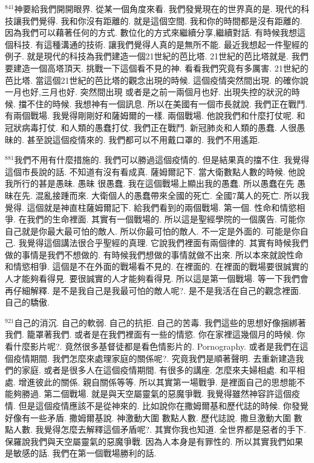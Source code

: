 \documentclass{book}
\begin{document}
$^{841}$神要給我們開開眼界.
從某一個角度來看.
我們發覺現在的世界真的是.
現代的科技讓我們覺得.
我和你沒有距離的.
就是這個空間.
我和你的時間都是沒有距離的.
因為我們可以藉著任何的方式.
數位化的方式來繼續分享,繼續對話.
有時候我想這個科技.
有這種溝通的技術.
讓我們覺得人真的是無所不能.
最近我想起一件聖經的例子.
就是現代的科技為我們建造一個21世紀的芭比塔.
21世紀的芭比塔就是.
我們要建造一個高塔頂天.
挑戰一下這個看不見的神.
看看我們究竟有多厲害.
21世紀的芭比塔.
當這個21世紀的芭比塔的觀念出現的時候.
這個疫情突然間出現.
的確你說一月也好,三月也好.
突然間出現 或者是之前一兩個月也好.
出現失控的狀況的時候.
擋不住的時候.
我想神有一個訊息.
所以在美國有一個市長就說.
我們正在戰鬥.
有兩個戰場.
我覺得剛剛好和薩姆爾的一樣.
兩個戰場.
他說我們和什麼打仗呢.
和冠狀病毒打仗.
和人類的愚蠢打仗.
我們正在戰鬥.
新冠肺炎和人類的愚蠢.
人很愚昧的.
甚至說這個疫情來的.
我們都可以不用戴口罩的.
我們不用遙距.

$^{881}$我們不用有什麼措施的.
我們可以勝過這個疫情的.
但是結果真的擋不住.
我覺得這個市長說的話.
不知道有沒有看成真.
薩姆爾記下.
當大衛數點人數的時候.
他說我所行的甚是愚昧.
愚昧 很愚蠢.
我在這個戰場上顯出我的愚蠢.
所以愚蠢在先 愚昧在先.
混亂接踵而來.
大衛個人的愚蠢帶來全國的死亡.
全國7萬人的死亡.
所以我覺得.
這個就是神直柱薩姆爾記下.
給我們看到的兩個戰場.
第一個.
性命和情慾相爭.
在我們的生命裡面.
其實有一個戰場的.
所以這是聖經學院的一個廣告.
可能你自己就是你最大最可怕的敵人.
所以你最可怕的敵人.
不一定是外面的.
可能是你自己.
我覺得這個講法很合乎聖經的真理.
它說我們裡面有兩個律的.
其實有時候我們做的事情是我們不想做的.
有時候我們想做的事情就做不出來.
所以本來就說性命和情慾相爭.
這個是不在外面的戰場看不見的.
在裡面的.
在裡面的戰場要很誠實的人才能夠看得見.
要很誠實的人才能夠看得見.
所以這是第一個戰場.
等一下我們會再仔細解釋.
是不是我自己是我最可怕的敵人呢?.
是不是我活在自己的觀念裡面.
自己的驕傲.

$^{921}$自己的消沉.
自己的軟弱.
自己的抗拒.
自己的苦毒.
我們這些的思想好像捆綁著我們.
籠罩著我們.
或者是在我們裡面有一些的情慾.
你在家裡這幾個月的時候.
你看什麼影片呢?.
竟然很多基督徒都是看色情影片的.
Pornography.
或者是我們在這個疫情期間.
我們怎麼來處理家庭的關係呢?.
究竟我們是順著聲明.
去重新建造我們的家庭.
或者是很多人在這個疫情期間.
有很多的講座.
怎麼來夫婦相處.
和平相處.
增進彼此的關係.
親自關係等等.
所以其實第一場戰爭.
是裡面自己的思想能不能夠勝過.
第二個戰場.
就是與天空屬靈氣的惡魔爭戰.
我覺得雖然神容許這個疫情.
但是這個疫情應該不是從神來的.
比如說你在撒姆爾基和歷代誌的時候.
你發覺好像有一些矛盾.
撒姆爾基說.
神激動大圍 數點人數.
歷代誌說.
撒旦激動大圍 數點人數.
我覺得怎麼去解釋這個矛盾呢?.
其實你我也知道.
全世界都是惡者的手下.
保羅說我們與天空屬靈氣的惡魔爭戰.
因為人本身是有罪性的.
所以其實我們如果是敏感的話.
我們在第一個戰場勝利的話.
\end{document}

